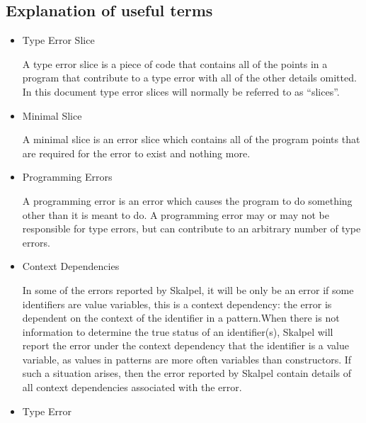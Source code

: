 \documentclass{report}
\begin{document}
\subsection{Explanation of useful terms}
\begin{itemize}


\item Type Error Slice

  \subitem A type error slice is a piece of code that contains all of
  the points in a program that contribute to a type error with all of
  the other details omitted. In this document type error slices will
  normally be referred to as ``slices''.


\item Minimal Slice

  \subitem A minimal slice is an error slice which contains all of the
  program points that are required for the error to exist and nothing
  more.


\item Programming Errors

  \subitem A programming error is an error which causes the program to
  do something other than it is meant to do. A programming error may
  or may not be responsible for type errors, but can contribute to an
  arbitrary number of type errors.


\item Context Dependencies

  \subitem In some of the errors reported by Skalpel, it
  will be only be an error if some identifiers are value variables,
  this is a context dependency: the error is dependent on the context
  of the identifier in a pattern.When there is not information to
  determine the true status of an identifier(s), Skalpel
  will report the error under the context dependency that the
  identifier is a value variable, as values in patterns are more often
  variables than constructors. If such a situation arises, then the
  error reported by Skalpel contain details of all
  context dependencies associated with the error.



\item Type Error


\end{itemize}
\end{document}
